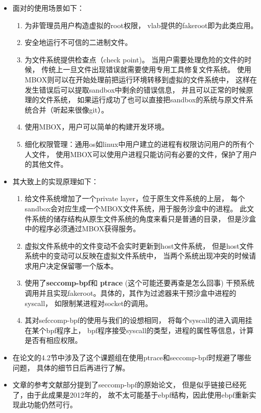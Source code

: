 \documentclass[AutoFakeBold,a4paper]{ctexart}
\begin{document}
\begin{itemize}
    \item 面对的使用场景如下：
    \begin{enumerate}
        \item 为非管理员用户构造虚拟的root权限，
        vlab提供的fakeroot即为此类应用。
        \item 安全地运行不可信的二进制文件。
        \item 为文件系统提供检查点（check point)。
        当用户需要处理危险的文件的时候，
        传统上一旦文件出现错误就需要使用专用工具修复文件系统。
        使用MBOX则可以在开始处理前把运行环境转移到虚拟的文件系统中，
        这样在发生错误后可以提取sandbox中剩余的错误信息，
        并且可以正常的时候原理的文件系统，
        如果运行成功了也可以直接把sandbox的系统与原文件系统合并（听起来很像git）。
        \item 使用MBOX，用户可以简单的构建开发环境。
        \item 细化权限管理：通用os如linux中用户建立的进程有权限访问用户的所有个人文件，
        使用MBOX可以使用户进程只能访问有必要的文件，保护了用户的其他文件。
    \end{enumerate}
    \item 其大致上的实现原理如下：
    \begin{enumerate}
        \item 给文件系统增加了一个private layer，位于原生文件系统的上层，
        每个sandbox会对应生成一个MBOX文件系统，用于服务沙盒中的进程。
        此文件系统的储存结构从原生文件系统的角度来看只是普通的目录，
        但是沙盒中的程序必须通过MBOX获得服务。
        \item 虚拟文件系统中的文件变动不会实时更新到host文件系统，
        但是host文件系统中的变动可以反映在虚拟文件系统中，
        当两个系统出现冲突的时候请求用户决定保留哪一个版本。
        \item 使用了\textbf{seccomp-bpf}和
        \textbf{ptrace} (这个可能还要再查是怎么回事) 
        干预系统调用并且实现fakeroot。具体的，其作为过滤器来干预沙盒中进程的syscall，
        如限制某进程对socket的调用。
        \item 其对sefccomp-bpf的使用与我们的设想相同，
        将每个syscall的进入调用挂在某个bpf程序上，
        bpf程序接受syscall的类型，进程的属性等信息，计算是否有相应权限。
    \end{enumerate}
    \item 在论文的4.2节中涉及了这个课题组在使用ptrace和seccomp-bpf时规避了哪些问题，
    具体的细节日后再进行了解。
    \item 文章的参考文献部分提到了seccomp-bpf的原始论文\cite{DynSec}，
    但是似乎链接已经死了，由于此成果是2012年的，
    故不太可能基于ebpf结构，因此使用ebpf重新实现此功能仍然可行。
\end{itemize}
\end{document}
